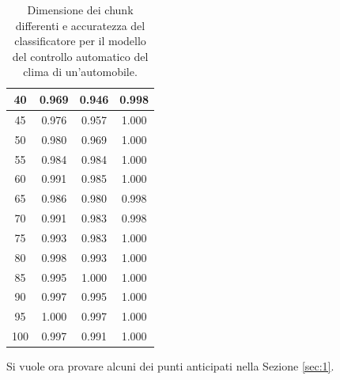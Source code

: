 \documentclass[Lau,binding=0.6cm,noexaminfo]{sapthesis}
\begin{document}
\begin{table}
\begin{center}
\begin{tabular}{|c|c|c|c|}
            \hline
            40 & 0.969 & 0.946 & 0.998 \\
            \hline
            45 & 0.976 & 0.957 & 1.000 \\
            \hline
            50 & 0.980 & 0.969 & 1.000 \\
            \hline
            55 & 0.984 & 0.984 & 1.000 \\
            \hline
            60 & 0.991 & 0.985 & 1.000 \\
            \hline
            65 & 0.986 & 0.980 & 0.998 \\
            \hline
            70 & 0.991 & 0.983 & 0.998 \\
            \hline
            75 & 0.993 & 0.983 & 1.000 \\
            \hline
            80 & 0.998 & 0.993 & 1.000 \\
            \hline
            85 & 0.995 & 1.000 & 1.000 \\
            \hline
            90 & 0.997 & 0.995 & 1.000 \\
            \hline
            95 & 1.000 & 0.997 & 1.000 \\
            \hline
            100 & 0.997 & 0.991 & 1.000 \\
            \hline
        \end{tabular}
    \end{center}
    \caption{Dimensione dei chunk differenti e accuratezza del classificatore per il modello del controllo automatico del clima di un'automobile.}
    \label{tab:3}
\end{table}

Si vuole ora provare alcuni dei punti anticipati nella Sezione \ref{sec:1}.
\end{document}
